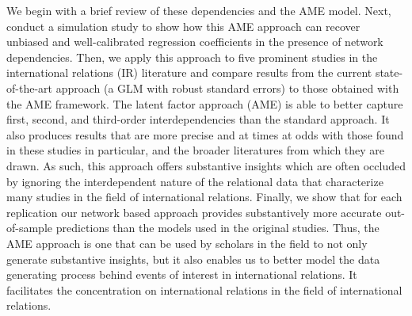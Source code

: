 We begin with a brief review of these dependencies and the AME model. Next, conduct a simulation study to show how this AME approach can recover unbiased and well-calibrated regression coefficients in the presence of network dependencies. Then, we apply this approach to five prominent studies in the international relations (IR) literature and compare results from the current state-of-the-art approach (a GLM with robust standard errors) to those obtained with the AME framework. The latent factor approach (AME) is able to better capture first, second, and third-order interdependencies than the standard approach. It also produces results that are more precise and at times at odds with those found in these studies in particular, and the broader literatures from which they are drawn. As such, this approach offers substantive insights which are often occluded by ignoring the interdependent nature of the relational data that characterize many studies in the field of international relations. Finally, we show that for each replication our network based approach provides substantively more accurate out-of-sample predictions than the models used in the original studies. Thus, the AME approach is one that can be used by scholars in the field to not only generate substantive insights, but it also enables us to better model the data generating process behind events of interest in international relations.  It facilitates the concentration on international relations in the field of international relations.